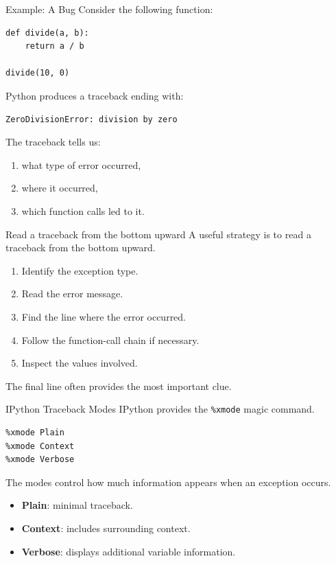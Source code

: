 \documentclass[11pt,aspectratio=43]{beamer}
\begin{document}
\begin{frame}[fragile]{Example: A Bug}
Consider the following function:

\begin{lstlisting}
def divide(a, b):
    return a / b

divide(10, 0)
\end{lstlisting}

Python produces a traceback ending with:

\begin{lstlisting}
ZeroDivisionError: division by zero
\end{lstlisting}

The traceback tells us:
\begin{enumerate}
  \item what type of error occurred,
  \item where it occurred,
  \item which function calls led to it.
\end{enumerate}
\end{frame}

\begin{frame}{Read a traceback from the bottom upward}
A useful strategy is to read a traceback from the bottom upward.

\begin{enumerate}
  \item Identify the exception type.
  \item Read the error message.
  \item Find the line where the error occurred.
  \item Follow the function-call chain if necessary.
  \item Inspect the values involved.
\end{enumerate}

\vspace{0.3cm}
The final line often provides the most important clue.
\end{frame}

\begin{frame}[fragile]{IPython Traceback Modes}
IPython provides the \texttt{\%xmode} magic command.

\begin{lstlisting}
%xmode Plain
%xmode Context
%xmode Verbose
\end{lstlisting}

The modes control how much information appears when an exception occurs.
\begin{itemize}
  \item \textbf{Plain}: minimal traceback.
  \item \textbf{Context}: includes surrounding context.
  \item \textbf{Verbose}: displays additional variable information.
\end{itemize}
\end{frame}
\end{document}
